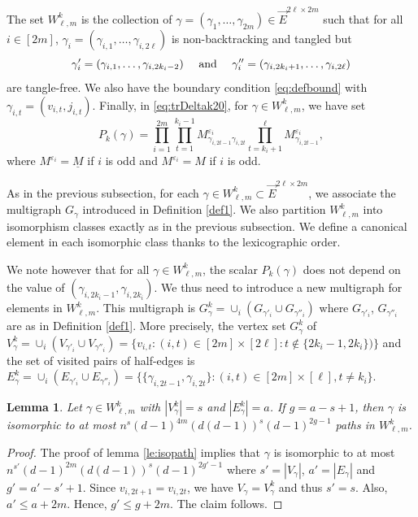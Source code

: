 \documentclass[11pt]{article}
\newtheorem{lemma}{Lemma}
\newcommand{\cE}{E}
\newcommand{\PAR}[1]{{{\left(#1\right)}}} %
\newcommand{\1}{1\!\!{\sf I}}\newcommand{\IND}{\1}
\newcommand{\veps}{\varepsilon}
\begin{document}
 The set $W^k_{\ell,m}$ is the collection of  $\gamma = ( \gamma_1, \ldots, \gamma_{2m}) \in \vec E^{2\ell  \times 2m}$ such that for all $i \in [2m]$, $\gamma_i  = (\gamma_{i,1}, \ldots, \gamma_{i,2\ell})$ is non-backtracking and tangled but $$\gamma'_i = ( \gamma_{i,1}, \ldots , \gamma_{i,2k_i-2}) \quad  \hbox{ and } \quad \gamma''_i =  ( \gamma_{i,2k_i+1}, \ldots , \gamma_{i,2\ell})$$ are tangle-free.  We also have the boundary condition \eqref{eq:defbound} with  $\gamma_{i,t} = (v_{i,t}, j_{i,t})$. Finally, in \eqref{eq:trDeltak20}, for $\gamma \in W^k_{\ell,m}$, we have set 
$$P_k (\gamma) =  \prod_{i=1}^{2m}  \prod_{t=1}^{k_i-1}  M^{\veps_i}_{\gamma_{i,2t-1}  \gamma_{i,2t}}   \prod_{t=k_i+1}^{\ell} M^{\veps_i}_{\gamma_{i,2t-1}}, $$
where $M^{\veps_i} = \underline M$ if $i$ is odd and $M^{\veps_i} = M$ if $i$ is odd.



As in the previous subsection, for each $\gamma \in W^k_{\ell,m} \subset \vec E^{2\ell \times 2m}$, we associate the multigraph $G_\gamma$ introduced in Definition \ref{def1}.  We also partition  $W^k_{\ell,m}$ into isomorphism classes exactly as in the previous subsection. We define a canonical element in each isomorphic class thanks to the lexicographic order. 


We note however that for all $\gamma \in W^k_{\ell,m}$, the scalar $P_k(\gamma)$ does not depend on the value of $(\gamma_{i,2k_i -1}, \gamma_{i,2k_i})$. We thus need to introduce a new multigraph for elements in $W^k_{\ell,m}$. This multigraph is $G^k_\gamma = \cup_{i} (G_{\gamma'_i} \cup G_{\gamma''_i})$ where $G_{\gamma'_i}$, $G_{\gamma''_i}$ are as in Definition  \ref{def1}. More precisely, the vertex set $G^k_\gamma$ of $V^k_\gamma = \cup_{i} (V_{\gamma'_i} \cup V_{\gamma''_i}) = \{ v_{i,t} : (i,t) \in [2m] \times [2\ell] : t  \notin \{2k_i-1,2k_i \}) \}$ and the set of visited pairs of half-edges is $\cE^k_\gamma = \cup_i (\cE_{\gamma'_i} \cup \cE_{\gamma''_i}) = \{ \{ \gamma_{i,2t-1}  , \gamma_{i,2t}  \} :   (i,t) \in [2m] \times [\ell], t \ne k_i \}$. 

\begin{lemma}\label{le:isopath0}
Let $\gamma \in W^k_{\ell,m}$ with $|V^k_\gamma| = s $ and $|\cE^k_\gamma| = a$. If $g = a - s +1$, then $\gamma$  is isomorphic to at most 
$
  n^s (d-1)^{4m} \PAR{ d (d-1) }^{ s} (d-1)^{2g -1} 
$ 
paths in $W^k_{\ell,m}$.    
\end{lemma}
\begin{proof}
The proof of lemma \ref{le:isopath} implies that $\gamma$ is isomorphic to at most 
$
  n^{s'} (d-1)^{2m} \PAR{ d (d-1) }^{ s} (d-1)^{2g' -1} 
$ 
where $s' = |V_\gamma|$, $a' = |\cE_\gamma|$ and $g' = a' - s' +1$. Since $v_{i,2t+1} = v_{i,2t}$, we have $V_\gamma = V^k _\gamma$ and thus $s' =s$. Also, $a' \leq a + 2m$. Hence, $g' \leq g + 2m$. The claim follows.
\end{proof}
\end{document}
